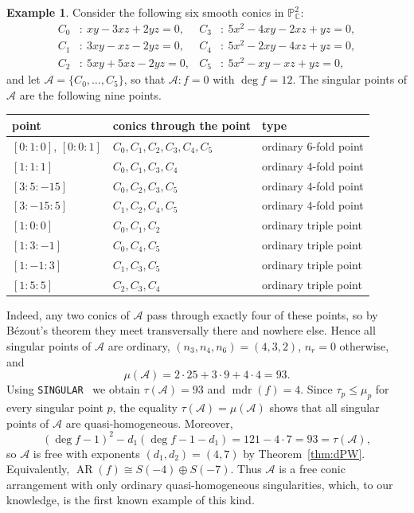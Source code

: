 \documentclass[11pt]{amsart}
\theoremstyle{definition}
\newtheorem{example}[theorem]{Example}
\numberwithin{equation}{section}
\newcommand{\gadd}[1]{#1}
\begin{document}
\begin{example}\label{ex:free-conics}
Consider the following six smooth conics in $\mathbb{P}^{2}_{\mathbb{C}}$:
\begin{align*}
C_0 &\colon\ xy-3xz+2yz=0, & C_3 &\colon\ 5x^2-4xy-2xz+yz=0,\\
C_1 &\colon\ 3xy-xz-2yz=0, & C_4 &\colon\ 5x^2-2xy-4xz+yz=0,\\
C_2 &\colon\ 5xy+5xz-2yz=0, & C_5 &\colon\ 5x^2-xy-xz+yz=0,
\end{align*}
and let $\mathcal{A}=\{C_0,\ldots,C_5\}$, so that $\mathcal{A}\colon f=0$ with $\deg f=12$.
The singular points of $\mathcal{A}$ are the following nine points.
\begin{center}
\begin{tabular}{lll}
\hline
point & conics through the point & type \\
\hline
$[0:1:0]$, $[0:0:1]$ & $C_0,C_1,C_2,C_3,C_4,C_5$ & ordinary $6$-fold point \\
$[1:1:1]$ & $C_0,C_1,C_3,C_4$ & ordinary $4$-fold point \\
$[3:5:-15]$ & $C_0,C_2,C_3,C_5$ & ordinary $4$-fold point \\
$[3:-15:5]$ & $C_1,C_2,C_4,C_5$ & ordinary $4$-fold point \\
$[1:0:0]$ & $C_0,C_1,C_2$ & ordinary triple point \\
$[1:3:-1]$ & $C_0,C_4,C_5$ & ordinary triple point \\
$[1:-1:3]$ & $C_1,C_3,C_5$ & ordinary triple point \\
$[1:5:5]$ & $C_2,C_3,C_4$ & ordinary triple point \\
\hline
\end{tabular}
\end{center}
Indeed, any two conics of $\mathcal{A}$ pass through exactly four of these points, so by B\'ezout's
theorem they meet transversally there and nowhere else. Hence all singular points of $\mathcal{A}$
are ordinary, $(n_3,n_4,n_6)=(4,3,2)$, $n_r=0$ otherwise, and
\[
\mu(\mathcal{A})=2\cdot 25+3\cdot 9+4\cdot 4=93 .
\]
Using \texttt{SINGULAR}~\cite{Sing} we obtain $\tau(\mathcal{A})=93$ and $\operatorname{mdr}(f)=4$.
Since $\tau_p\leq\mu_p$ for every singular point $p$, the equality $\tau(\mathcal{A})=\mu(\mathcal{A})$
shows that all singular points of $\mathcal{A}$ are quasi-homogeneous. Moreover,
\[
\gadd{(\deg f-1)^2-d_1(\deg f-1-d_1)}=121-4\cdot 7=93=\tau(\mathcal{A}),
\]
so $\mathcal{A}$ is free with exponents $(d_1,d_2)=(4,7)$ by Theorem~\gadd{\ref{thm:dPW}}. Equivalently,
$\operatorname{AR}(f)\cong S(-4)\oplus S(-7)$. Thus $\mathcal{A}$ is a free conic arrangement with
only ordinary quasi-homogeneous singularities, which, to our knowledge, is the first known example of this kind.


\end{example}
\end{document}
